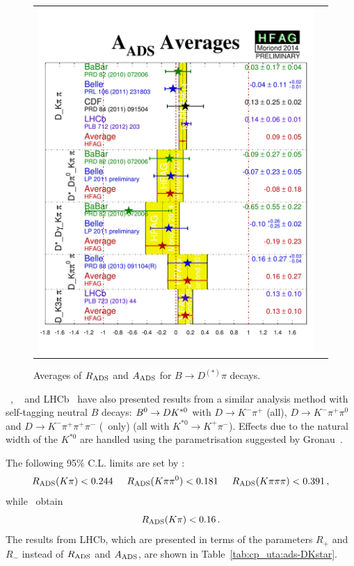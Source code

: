 \begin{figure}[htb]
\begin{center}
\begin{tabular}{cc}
{        \includegraphics{figures/cp_uta/A_ADS_Dpi}
      }
    \end{tabular}
  \end{center}
  \vspace{-0.8cm}
  \caption{
    Averages of $R_{\rm ADS}$ and $A_{\rm ADS}$ for $B \to D^{(*)}\pi$ decays.
  }
  \label{fig:cp_uta:cus:ads-Dpi}
\end{figure}

\babar~\cite{:2009au}, \belle~\cite{Negishi:2012uxa} and
LHCb~\cite{Aaij:2014eha} have also presented results from a similar analysis
method with self-tagging neutral $B$ decays: $B^0 \to DK^{*0}$ with $D \to K^-\pi^+$ (all), 
$D \to K^-\pi^+\pi^0$ and $D \to K^-\pi^+\pi^+\pi^-$ (\babar\ only)
(all with $K^{*0} \to K^+\pi^-$). 
Effects due to the natural width of the $K^{*0}$ are
handled using the parametrisation suggested by Gronau~\cite{Gronau:2002mu}. 

The following 95\% C.L. limits are set by \babar:
\begin{equation}
  R_{\rm ADS}(K\pi) < 0.244 \hspace{5mm}
  R_{\rm ADS}(K\pi\pi^0) < 0.181 \hspace{5mm}
  R_{\rm ADS}(K\pi\pi\pi) < 0.391 \, ,
\end{equation}
while \belle\ obtain
\begin{equation}
  R_{\rm ADS}(K\pi) < 0.16 \, .
\end{equation}
The results from LHCb, which are presented in terms of the parameters $R_+$ and $R_-$ instead of $R_{\rm ADS}$ and $A_{\rm ADS}$, are shown in Table~\ref{tab:cp_uta:ads-DKstar}.

